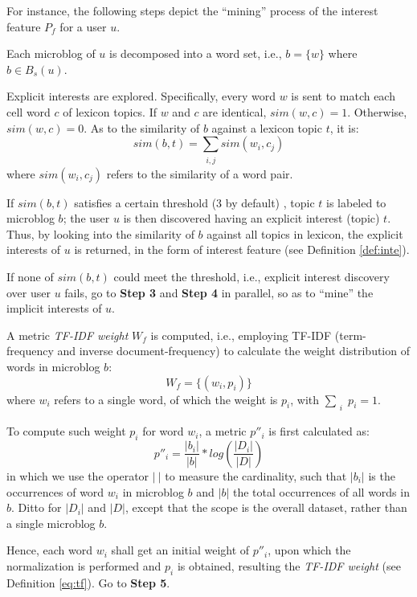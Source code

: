 For instance, the following steps depict the ``mining'' process of the interest feature $P_f$ for a user $u$.

 Each microblog of $u$ is decomposed into a word set, i.e., $b = \{w\}$ where $b \in B_s(u)$.

 Explicit interests are explored. Specifically, every word $w$ is sent to match each cell word $c$ of lexicon topics.
If $w$ and $c$ are identical, $sim(w, c) = 1$.
Otherwise, $sim(w, c) = 0$.
As to the similarity of $b$ against a lexicon topic $t$, it is:
\begin{equation}
\label{eq:bt}
sim(b, t) = \sum_{\substack{i, j}} sim(w_i, c_j)
\end{equation}
where $sim(w_i, c_j)$ refers to the similarity of a word pair.

If $sim(b, t)$ satisfies a certain threshold (3 by default) , topic $t$ is labeled to microblog $b$;
the user $u$ is then discovered having an explicit interest (topic) $t$.
Thus, by looking into the similarity of $b$ against all topics in lexicon, the explicit interests of $u$ is returned, in the form of interest feature (see Definition \ref{def:inte}).

If none of $sim(b, t)$ could meet the threshold, i.e., explicit interest discovery over user $u$ fails, go to \textbf{Step 3} and \textbf{Step 4} in parallel, so as to ``mine'' the implicit interests of $u$.

 A metric \textit{TF-IDF weight} $W_f$ is computed, i.e., employing TF-IDF (term-frequency and inverse document-frequency) to calculate the weight distribution of words in microblog $b$:
\begin{equation}
\label{eq:tf}
W_f = \{(w_i, p_i)\}
\end{equation}
where $w_i$ refers to a single word, of which the weight is $p_i$, with $\sum_{\substack{i}} p_i = 1$.

To compute such weight $p_i$ for word $w_i$, a metric $p''_i$ is first calculated as:
\begin{equation}
\label{eq:tf-w}
p''_i = \frac{|b_i|}{|b|} * log(\frac{|D_i|}{|D|})
\end{equation}
in which we use the operator $|\ |$ to measure the cardinality, such that $|b_i|$ is the occurrences of word $w_i$ in microblog $b$ and $|b|$ the total occurrences of all words in $b$.
Ditto for $|D_i|$ and $|D|$, except that the scope is the overall dataset, rather than a single microblog $b$.

Hence, each word $w_i$ shall get an initial weight of $p''_i$, upon which the normalization is performed and $p_i$ is obtained, resulting the \textit{TF-IDF weight} (see Definition \ref{eq:tf}).
Go to \textbf{Step 5}.

